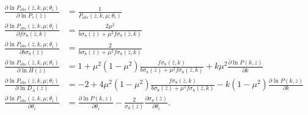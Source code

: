 \begin{subequations}

\begin{align}
\frac{\partial\ln P_{obs}\left(\bar{z},k,\mu;\theta_{i}\right)}{\partial\ln P_{s}(\bar{z})} & =\frac{1}{P_{obs}\left(\bar{z},k,\mu;\theta_{i}\right)}\\
\frac{\partial\ln P_{obs}\left(\bar{z},k,\mu;\theta_{i}\right)}{\partial f \sigma_8(\bar{z},k)} & = \frac{2 \mu^2}{b\sigma_8(\bar{z}) + \mu^2 f \sigma_8(\bar{z},k)}\\
\frac{\partial\ln P_{obs}\left(\bar{z},k,\mu;\theta_{i}\right)}{\partial b\sigma_8(\bar{z})} & = \frac{2 }{b\sigma_8(\bar{z}) + \mu^2 f \sigma_8(\bar{z},k)}\\
\frac{\partial\ln P_{obs}\left(\bar{z},k,\mu;\theta_{i}\right)}{\partial\ln H(\bar{z})} & = 1 + \mu^2 \left(1 - \mu^2\right) \frac{ f \sigma_8(\bar{z},k)
  }{b\sigma_8(\bar{z}) + 
     \mu^2 f \sigma_8(\bar{z},k)} + k \mu^2 \frac{\partial \ln P(k,z)}{\partial k}\\
\frac{\partial\ln P_{obs}\left(\bar{z},k,\mu;\theta_{i}\right)}{\partial\ln D_{A}(\bar{z})} & =  
-2 + 4 \mu^2 \left(1 - \mu^2\right)\frac{ f \sigma_8(\bar{z},k)}{
  b\sigma_8(\bar{z}) + \mu^2 f \sigma_8(\bar{z},k)} - 
k (1 - \mu^2) \frac{\partial \ln P(k,z)}{\partial k}
\\
\frac{\partial\ln P_{obs}\left(\bar{z},k,\mu;\theta_{i}\right)}{\partial \theta_i} & = \frac{\partial \ln P(k,z)}{\partial \theta_i} - 
\frac{2}{\sigma_8(\bar{z})} \frac{\partial \sigma_8(\bar{z})}{\partial \theta_i}. \label{eq: partial-derivs-subeqns-sigma8}
\end{align}
\label{eq: partial-derivs-subeqns-2}

\end{subequations}


